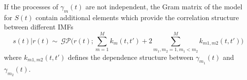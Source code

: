 If the processes of $\gamma_m(t)$ are not independent, the Gram matrix of the model for $S(t)$ contain additional elements which provide the correlation structure between different IMFs
\begin{equation}
s(t) |r(t)\sim ~   \mathcal{GP} \bigg(r(t); \sum_{m=1}^M k_m(t,t') + 2\sum_{m_1,m_2=1, m_1<m_2}^M k_{m1,m2}(t,t')\bigg) 
\end{equation}
where $k_{m1,m2}(t,t')$ defines the dependence structure between $\gamma_{m_1}(t)$ and $\gamma_{m_2}(t)$.






